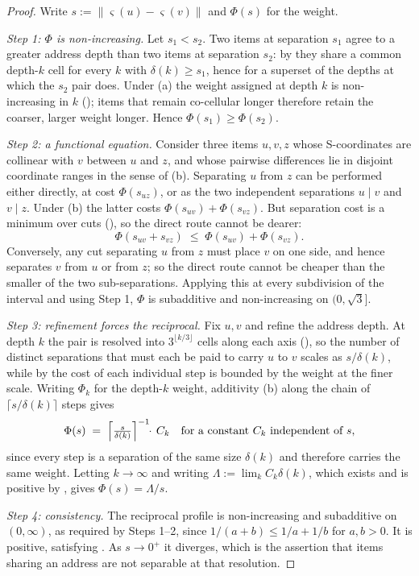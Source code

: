 \documentclass[11pt,twocolumn,a4paper]{article}
\theoremstyle{thmstyle}
\theoremstyle{definition}
\theoremstyle{remark}
\newcommand{\sse}{\varsigma}
\newcommand{\norm}[1]{\lVert#1\rVert}
\begin{document}
\begin{proof}
Write $s := \norm{\sse(u)-\sse(v)}$ and $\Phi(s)$ for the weight.

\emph{Step 1: $\Phi$ is non-increasing.} Let $s_1 < s_2$. Two items at
separation $s_1$ agree to a greater address depth than two items at
separation $s_2$: by  they share a common depth-$k$
cell for every $k$ with $\delta(k) \geq s_1$, hence for a superset of
the depths at which the $s_2$ pair does. Under (a) the weight assigned
at depth $k$ is non-increasing in $k$ (); items that
remain co-cellular longer therefore retain the coarser, larger weight
longer. Hence $\Phi(s_1) \geq \Phi(s_2)$.

\emph{Step 2: a functional equation.} Consider three items $u,v,z$
whose S-coordinates are collinear with $v$ between $u$ and $z$, and
whose pairwise differences lie in disjoint coordinate ranges in the
sense of (b). Separating $u$ from $z$ can be performed either directly,
at cost $\Phi(s_{uz})$, or as the two independent separations
$u\!\mid\!v$ and $v\!\mid\!z$. Under (b) the latter costs
$\Phi(s_{uv}) + \Phi(s_{vz})$. But separation cost is a minimum over
cuts (), so the direct route cannot be dearer:
\[
  \Phi(s_{uv} + s_{vz}) \;\leq\; \Phi(s_{uv}) + \Phi(s_{vz}).
\]
Conversely, any cut separating $u$ from $z$ must place $v$ on one side,
and hence separates $v$ from $u$ or from $z$; so the direct route
cannot be cheaper than the smaller of the two sub-separations. Applying
this at every subdivision of the interval and using Step 1, $\Phi$ is
subadditive and non-increasing on $(0,\sqrt3]$.

\emph{Step 3: refinement forces the reciprocal.} Fix $u,v$ and refine
the address depth. At depth $k$ the pair is resolved into
$3^{\lfloor k/3\rfloor}$ cells along each axis (),
so the number of distinct separations that must each be paid to carry
$u$ to $v$ scales as $s/\delta(k)$, while by  the
cost of each individual step is bounded by the weight at the finer
scale. Writing $\Phi_k$ for the depth-$k$ weight, additivity (b) along
the chain of $\lceil s/\delta(k)\rceil$ steps gives
\[
  \Phi(s) \;=\; \Bigl\lceil \tfrac{s}{\delta(k)} \Bigr\rceil^{-1}
  \!\!\cdot\, C_k
  \quad\text{for a constant } C_k \text{ independent of } s,
\]
since every step is a separation of the same size $\delta(k)$ and
therefore carries the same weight. Letting $k \to \infty$ and writing
$\Lambda := \lim_k C_k \delta(k)$, which exists and is positive by
, gives $\Phi(s) = \Lambda/s$.

\emph{Step 4: consistency.} The reciprocal profile is non-increasing
and subadditive on $(0,\infty)$, as required by Steps 1--2, since
$1/(a+b) \leq 1/a + 1/b$ for $a,b>0$. It is positive, satisfying
. As $s \to 0^+$ it diverges, which is the assertion
that items sharing an address are not separable at that resolution.
\end{proof}
\end{document}
